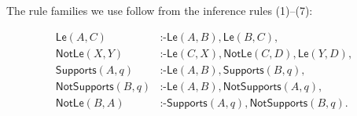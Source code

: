 The rule families we use follow from the inference rules (1)--(7):
\begin{footnotesize}
\begin{align*}
\mathsf{Le}(A,C)&\texttt{:-}\mathsf{Le}(A,B),\mathsf{Le}(B,C),\\
\mathsf{NotLe}(X,Y)&\texttt{:-}\mathsf{Le}(C,X),\mathsf{NotLe}(C,D),\mathsf{Le}(Y,D),\\
\mathsf{Supports}(A,q)&\texttt{:-}\mathsf{Le}(A,B),\mathsf{Supports}(B,q),\\
\mathsf{NotSupports}(B,q)&\texttt{:-}\mathsf{Le}(A,B),\mathsf{NotSupports}(A,q),\\
\mathsf{NotLe}(B,A)&\texttt{:-}\mathsf{Supports}(A,q),\mathsf{NotSupports}(B,q).\\
\end{align*}
\end{footnotesize}


